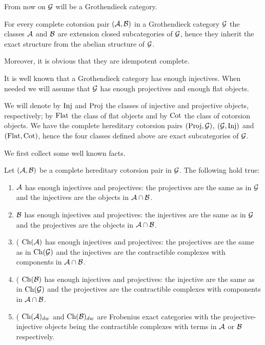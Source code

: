 %
%
%
%
%
%
%


%

%
From now on $\mathcal{G}$ will be a Grothendieck category.

For every complete cotorsion pair $(\mathcal{A}, \mathcal{B})$ in a Grothendieck category $\mathcal{G}$ the classes $\mathcal{A}$ and $\mathcal{B}$ are extension closed subcategories of $\mathcal{G}$, hence they inherit the exact structure from the abelian structure of $\mathcal{G}$.

Moreover, it is obvious that they are idempotent complete.

 It is well known that a Grothendieck category has enough injectives.
When needed we will assume that $\mathcal{G}$ has enough projectives and enough flat objects.

We will denote by $\mathrm{Inj}$ and $\mathrm{Proj}$ the classes of injective and projective objects, respectively; by $\mathrm{Flat}$ the class of flat objects and by $\mathrm{Cot}$ the class of cotorsion objects.  We have the complete hereditary cotorsion pairs $(\mathrm{Proj}, \mathcal{G})$, $(\mathcal{G}, \mathrm{Inj})$ and $(\mathrm{Flat}, \mathrm{Cot})$, hence the four classes defined above are exact subcategories of $\mathcal{G}$.

We first collect some well known facts.
\begin{fact}\label{F:proj-inj} Let $(\mathcal{A}, \mathcal{B})$ be a complete hereditary cotorsion pair in $\mathcal{G}$. The following hold true:
\begin{enumerate}
\item $\mathcal{A}$ has enough injectives and projectives: the projectives are the same as in $\mathcal{G}$ and the injectives are the objects in $\mathcal{A}\cap\mathcal{B}$.
\item $\mathcal{B}$ has enough injectives and projectives: the injectives are the same as in $\mathcal{G}$ and the projectives are the objects in $\mathcal{A}\cap\mathcal{B}$.
\item (\cite[Corollary 2.9]{G7} $\mathrm{Ch}(\mathcal{A})$ has enough injectives and projectives: the projectives are the same as in $\mathrm{Ch}(\mathcal{G})$ and the injectives are the contractible complexes with components in $\mathcal{A}\cap\mathcal{B}$.
\item (\cite[Corollary 2.9]{G7} $\mathrm{Ch}(\mathcal{B})$ has enough injectives and projectives: the injective are the same as in $\mathrm{Ch}(\mathcal{G})$ and the projectives are the contractible complexes with components in $\mathcal{A}\cap\mathcal{B}$.
\item (\cite[Corollary 2.8]{G7} $\mathrm{Ch}(\mathcal{A})_{dw}$ and $\mathrm{Ch}(\mathcal{B})_{dw}$ are Frobenius exact categories with the  projective-injective objects being the contractible complexes with terms in $\mathcal{A}$ or $\mathcal{B}$ respectively.
\end{enumerate}
\end{fact}


